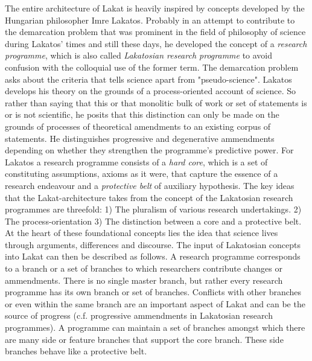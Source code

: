 \documentclass[14pt]{article}
\begin{document}
The entire architecture of Lakat is heavily inspired by concepts developed by the Hungarian philosopher Imre Lakatos. Probably in an attempt to contribute to the demarcation problem that was prominent in the field of philosophy of science during Lakatos' times and still these days, he developed the concept of a \textit{research programme}, which is also called \textit{Lakatosian research programme} to avoid confusion with the colloquial use of the former term. The demarcation problem asks about the criteria that tells science apart from "pseudo-science".  Lakatos develops his theory on the grounds of a process-oriented account of science. So rather than saying that this or that monolitic bulk of work or set of statements is or is not scientific, he posits that this distinction can only be made on the grounds of processes of theoretical amendments to an existing corpus of statements. He distinguishes progressive and degenerative ammendments depending on whether they strengthen the programme's predictive power. For Lakatos a research programme consists of a \textit{hard core}, which is a set of constituting assumptions, axioms as it were, that capture the essence of a research endeavour and a \textit{protective belt} of auxiliary hypothesis. The key ideas that the Lakat-architecture takes from the concept of the Lakatosian research programmes are threefold: 1) The pluralism of various research undertakings. 2) The process-orientation 3) The distinction between a core and a protective belt. At the heart of these foundational concepts lies the idea that science lives through arguments, differences and discourse. The input of Lakatosian concepts into Lakat can then be described as follows. A research programme corresponds to a branch or a set of branches to which researchers contribute changes or ammendments. There is no single master branch, but rather every research programme has its own branch or set of branches. Conflicts with other branches or even within the same branch are an important aspect of Lakat and can be the source of progress (c.f. progressive ammendments in Lakatosian research programmes). A programme can maintain a set of branches amongst which there are many side or feature branches that support the core branch. These side branches behave like a protective belt.  

\end{document}
